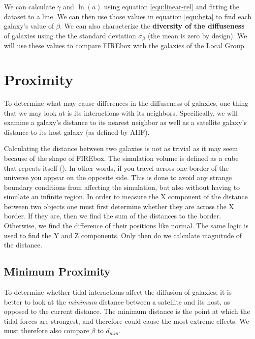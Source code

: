 We can calculate $\gamma$ and $\ln(a)$ using equation \ref{equ:linear-rel} and fitting the dataset to a line. We can then use those values in equation \ref{equ:beta} to find each galaxy's value of $\beta$. We can also characterize the \textbf{diversity of the diffuseness} of galaxies using the the standard deviation $\sigma_\beta$ (the mean is zero by design). We will use these values to compare FIREbox with the galaxies of the Local Group.

\section{Proximity}
To determine what may cause differences in the diffuseness of galaxies, one thing that we may look at is its interactions with its neighbors. Specifically, we will examine a galaxy's distance to its nearest neighbor as well as a satellite galaxy's distance to its host galaxy (as defined by AHF).

Calculating the distance between two galaxies is not as trivial as it may seem because of the shape of FIREbox. The simulation volume is defined as a cube that repeats itself (\cite{feldmannFIREboxSimulatingGalaxies2022}). In other words, if you travel across one border of the universe you appear on the opposite side. This is done to avoid any strange boundary conditions from affecting the simulation, but also without having to simulate an infinite region. In order to measure the X component of the distance between two objects one must first determine whether they are across the X border. If they are, then we find the sum of the distances to the border. Otherwise, we find the difference of their positions like normal. The same logic is used to find the Y and Z components. Only then do we calculate magnitude of the distance.

\subsection{Minimum Proximity}

To determine whether tidal interactions affect the diffusion of galaxies, it is better to look at the \emph{minimum} distance between a satellite and its host, as opposed to the current distance. The minimum distance is the point at which the tidal forces are strongest, and therefore could cause the most extreme effects. We must therefore also compare $\beta$ to $d_{min}$. 